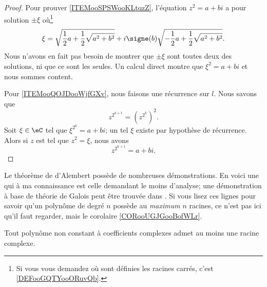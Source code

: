 \begin{proof}
    Pour prouver \ref{ITEMooSPSWooKLtqzZ}, l'équation \( z^2=a+bi\) a pour solution \( \pm\xi\) où\footnote{Si vous vous demandez où sont définies les racines carrés, c'est \ref{DEFooGQTYooORuvQb}.}
        \begin{equation}
            \xi=\sqrt{ \frac{ 1 }{2}a+\frac{ 1 }{2}\sqrt{ a^2+b^2 } }+i\signe(b)\sqrt{ -\frac{ 1 }{2}a+\frac{ 1 }{2}\sqrt{ a^2+b^2 } }.
        \end{equation}
        Nous n'avons en fait pas besoin de montrer que \( \pm\xi\) sont toutes deux des solutions, ni que ce sont les seules. Un calcul direct montre que \( \xi^2=a+bi\) et nous sommes content.

    Pour \ref{ITEMooQOJDooWjfGXv}, nous faisons une récurrence sur \( l\). Nous savons que
        \begin{equation}
            z^{2^{k+1}}=(z^{2^k})^2.
        \end{equation}
        Soit \( \xi\in \eC\) tel que \( \xi^{2^k}=a+bi\); un tel \( \xi\) existe par hypothèse de récurrence. Alors si \( z\) est tel que \( z^2=\xi\), nous avons 
        \begin{equation}
            z^{2^{k+1}}=a+bi.
        \end{equation}
\end{proof}

Le théorème de d'Alembert possède de nombreuses démonstrations. En voici une qui à ma connaissance est celle demandant le moins d'analyse; une démonstration à base de théorie de Galois peut être trouvée dans \cite{rqrNyg,ooPSLMooAVODjn}. Si vous lisez ces lignes pour savoir qu'un polynôme de degré \( n\) possède au \emph{maximum} \( n\) racines, ce n'est pas ici qu'il faut regarder, mais le corolaire \ref{CORooUGJGooBofWLr}.
\begin{theorem}   \label{THOooIRJYooBiHRyW}
    Tout polynôme non constant à coefficients complexes admet au moins une racine complexe.
\end{theorem}

